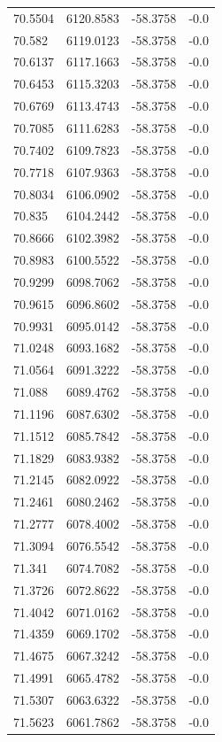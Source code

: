 \begin{table}[H]
\begin{tabular}{llll}
70.5504 & 6120.8583 & -58.3758 & -0.0 \\
70.582 & 6119.0123 & -58.3758 & -0.0 \\
70.6137 & 6117.1663 & -58.3758 & -0.0 \\
70.6453 & 6115.3203 & -58.3758 & -0.0 \\
70.6769 & 6113.4743 & -58.3758 & -0.0 \\
70.7085 & 6111.6283 & -58.3758 & -0.0 \\
70.7402 & 6109.7823 & -58.3758 & -0.0 \\
70.7718 & 6107.9363 & -58.3758 & -0.0 \\
70.8034 & 6106.0902 & -58.3758 & -0.0 \\
70.835 & 6104.2442 & -58.3758 & -0.0 \\
70.8666 & 6102.3982 & -58.3758 & -0.0 \\
70.8983 & 6100.5522 & -58.3758 & -0.0 \\
70.9299 & 6098.7062 & -58.3758 & -0.0 \\
70.9615 & 6096.8602 & -58.3758 & -0.0 \\
70.9931 & 6095.0142 & -58.3758 & -0.0 \\
71.0248 & 6093.1682 & -58.3758 & -0.0 \\
71.0564 & 6091.3222 & -58.3758 & -0.0 \\
71.088 & 6089.4762 & -58.3758 & -0.0 \\
71.1196 & 6087.6302 & -58.3758 & -0.0 \\
71.1512 & 6085.7842 & -58.3758 & -0.0 \\
71.1829 & 6083.9382 & -58.3758 & -0.0 \\
71.2145 & 6082.0922 & -58.3758 & -0.0 \\
71.2461 & 6080.2462 & -58.3758 & -0.0 \\
71.2777 & 6078.4002 & -58.3758 & -0.0 \\
71.3094 & 6076.5542 & -58.3758 & -0.0 \\
71.341 & 6074.7082 & -58.3758 & -0.0 \\
71.3726 & 6072.8622 & -58.3758 & -0.0 \\
71.4042 & 6071.0162 & -58.3758 & -0.0 \\
71.4359 & 6069.1702 & -58.3758 & -0.0 \\
71.4675 & 6067.3242 & -58.3758 & -0.0 \\
71.4991 & 6065.4782 & -58.3758 & -0.0 \\
71.5307 & 6063.6322 & -58.3758 & -0.0 \\
71.5623 & 6061.7862 & -58.3758 & -0.0 \\

\end{tabular}
\end{table}
